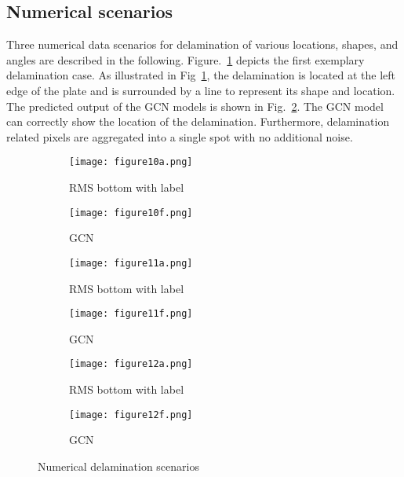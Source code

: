 \documentclass[runningheads]{llncs}
\begin{document}
\subsection{Numerical scenarios}
Three numerical data scenarios for delamination of various locations, shapes, and angles are described in the following.
Figure.~\ref{fig:RMS_flat_shell_Vz_448} depicts the first exemplary delamination case.
As illustrated in Fig~\ref{fig:RMS_flat_shell_Vz_448}, the delamination is located at the left edge of the plate and is surrounded by a line to represent its shape and location.
The predicted output of the GCN models is shown in Fig.~\ref{fig:gcn_pred_448}. 
The GCN model can correctly show the location of the delamination.
Furthermore, delamination related pixels are aggregated into a single spot with no additional noise.
\begin{figure}[!ht]
	\centering
	\begin{subfigure}[b]{0.47\textwidth}
		\centering
		\texttt{[image: figure10a.png]}
		\caption{RMS bottom with label}
		\label{fig:RMS_flat_shell_Vz_448}
	\end{subfigure}
	\begin{subfigure}[b]{0.47\textwidth}
		\centering
		\texttt{[image: figure10f.png]}
		\caption{GCN}
		\label{fig:gcn_pred_448}
	\end{subfigure}
	\begin{subfigure}[b]{0.47\textwidth}
		\centering
		\texttt{[image: figure11a.png]}
		\caption{RMS bottom with label}
		\label{fig:RMS_flat_shell_Vz_385}
	\end{subfigure}
	\begin{subfigure}[b]{0.47\textwidth}
		\centering
		\texttt{[image: figure11f.png]}
		\caption{GCN}
		\label{fig:gcn_pred_385}
	\end{subfigure}
	\begin{subfigure}[b]{0.47\textwidth}
		\centering
		\texttt{[image: figure12a.png]}
		\caption{RMS bottom with label}
		\label{fig:RMS_flat_shell_Vz_475}
	\end{subfigure}
	\begin{subfigure}[b]{0.47\textwidth}
		\centering
		\texttt{[image: figure12f.png]}
		\caption{GCN}
		\label{fig:gcn_pred_475}
	\end{subfigure}
	\caption{Numerical delamination scenarios}
	\label{fig:385_softmax}
\end{figure} 
\end{document}
